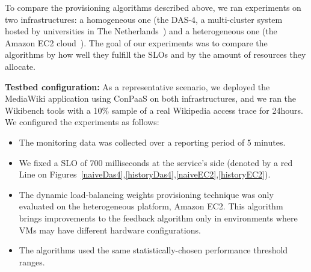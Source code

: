 To compare the provisioning algorithms described above, we ran experiments
on two infrastructures: a homogeneous one (the DAS-4, a multi-cluster system
hosted by universities in The Netherlands~\cite{das4}) and a heterogeneous
one (the Amazon EC2 cloud~\cite{amazonEC2}). The goal of our experiments
was to compare the algorithms by how well they fulfill the SLOs and by
the amount of resources they allocate.



\textbf{Testbed configuration:}  As a representative scenario, we deployed the MediaWiki application using ConPaaS on both infrastructures, and we ran the Wikibench tools with a 10\% sample of a real Wikipedia access trace for 24hours. 
We configured the experiments as follows: 

\begin{itemize}

\item The monitoring data was collected over a reporting period of 5 minutes.

\item We fixed a SLO of 700 milliseconds at the service's side (denoted by a red Line on Figures~\ref{naiveDas4},\ref{historyDas4},\ref{naiveEC2},\ref{historyEC2}).


\item The dynamic load-balancing weights provisioning technique was only evaluated on the heterogeneous platform, Amazon EC2. This algorithm brings improvements to the feedback algorithm only in environments where VMs may have different hardware configurations. 

\item The algorithms used the same statistically-chosen performance threshold ranges. 

\end{itemize}


